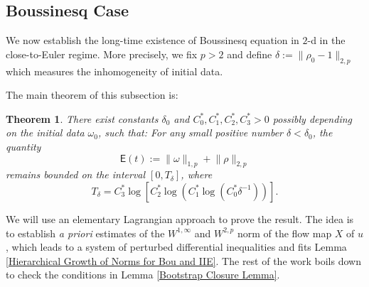 \documentclass[12pt,letterpaper]{article}
\newtheorem{thm}{Theorem}[section]
\theoremstyle{plain}
\begin{document}
\subsection{Boussinesq Case}

We now establish the long-time existence of Boussinesq equation in $2$-d in the close-to-Euler regime. More precisely, we fix $p>2$ and define $\delta:=\lVert \rho_0-1\rVert_{2,p}$ which measures the inhomogeneity of initial data. 


The main theorem of this subsection is:
\begin{thm}\label{Lifespan of Boussinesq} There exist constants $\delta_0$ and $C_0^*,C_1^*, C_2^*, C_3^*>0$ possibly depending on the initial data $\omega_0$, such that: For any small positive number $\delta<\delta_0$, the quantity 
\begin{equation*}
\mathsf E(t):=\lVert\omega\rVert_{1,p}+\lVert\rho\rVert_{2,p}   
\end{equation*} 
remains bounded on the interval $[0,T_\delta]$, where
\begin{equation}\label{Triple Log Lower bound for Lifespan}
 T_\delta=C_3^*\log [C_2^*\log (C_1^*\log( C_0^*\delta^{-1}))]   .
\end{equation}
\end{thm} 


We will use an elementary Lagrangian approach to prove the result. The idea is to establish \textit{a priori} estimates of the $W^{1,\infty}$ and $W^{2,p}$ norm of the flow map $X$ of $u$, which leads to a system of perturbed differential inequalities and fits Lemma \ref{Hierarchical Growth of Norms for Bou and IIE}. The rest of the work boils down to check the conditions in Lemma \ref{Bootstrap Closure Lemma}. 
\end{document}
